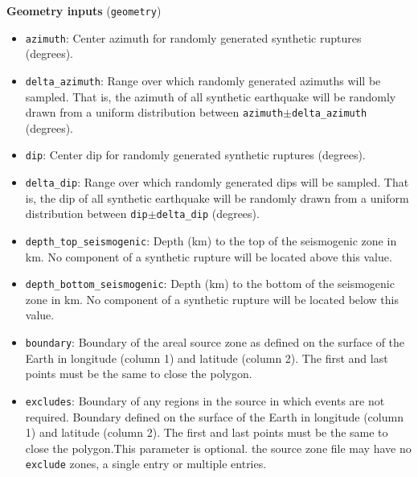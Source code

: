 \textbf{Geometry inputs} (\texttt{geometry})
\begin{itemize}

\item \texttt{azimuth}: Center azimuth for randomly generated
  synthetic ruptures (degrees).

\item \texttt{delta\_azimuth}: Range over which randomly generated
  azimuths will be sampled. That is, the azimuth of all synthetic
  earthquake will be randomly drawn from a uniform distribution
  between \texttt{azimuth}$\pm$\texttt{delta\_azimuth} (degrees).

\item \texttt{dip}: Center dip for randomly generated synthetic
  ruptures (degrees).

\item \texttt{delta\_dip}: Range over which randomly generated dips will
be sampled. That is, the dip of all synthetic earthquake will be
randomly drawn from a uniform distribution between
\texttt{dip}$\pm$\texttt{delta\_dip} (degrees).

\item \texttt{depth\_top\_seismogenic}: Depth (km) to the top of the
  seismogenic zone in km.  No component of a synthetic rupture will be
  located above this value.

\item \texttt{depth\_bottom\_seismogenic}: Depth (km) to the bottom of
  the seismogenic zone in km.  No component of a synthetic rupture
  will be located below this value.

\item \texttt{boundary}: Boundary of the areal source zone as
defined on the surface of the Earth in longitude (column 1) and
latitude (column 2). The first and last points must be the same to
close the polygon.

\item \texttt{excludes}: Boundary of any regions in the source in
  which events are not required. Boundary defined on the surface of
  the Earth in longitude (column 1) and latitude (column 2). The first
  and last points must be the same to close the polygon.This parameter
  is optional. the source zone file may have no \texttt{exclude}
  zones, a single entry or multiple entries.

\end{itemize}

